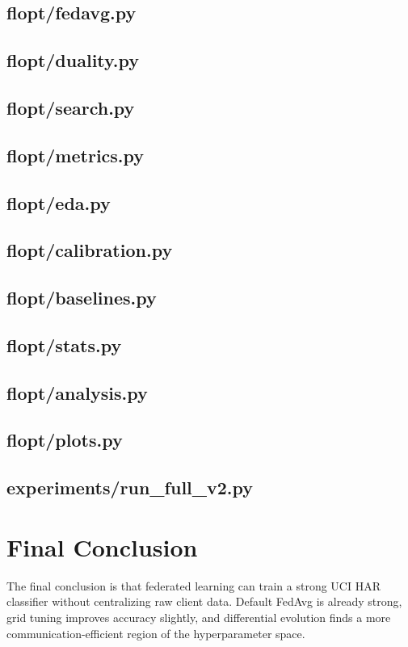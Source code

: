 \documentclass[11pt]{report}
\begin{document}
\section{flopt/fedavg.py}

\section{flopt/duality.py}

\section{flopt/search.py}

\section{flopt/metrics.py}

\section{flopt/eda.py}

\section{flopt/calibration.py}

\section{flopt/baselines.py}

\section{flopt/stats.py}

\section{flopt/analysis.py}

\section{flopt/plots.py}

\section{experiments/run\_full\_v2.py}

\chapter{Final Conclusion}
The final conclusion is that federated learning can train a strong UCI HAR classifier without
centralizing raw client data. Default FedAvg is already strong, grid tuning improves accuracy
slightly, and differential evolution finds a more communication-efficient region of the
hyperparameter space.
\end{document}
